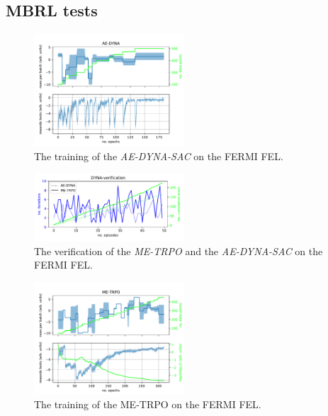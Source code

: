 \documentclass[
reprint,
amsmath,amssymb,amsfonts,clevref,
aps,
prstab,
]{revtex4-2}
\begin{document}
	\subsection{MBRL tests}
	\begin{figure}
		\centering
		\includegraphics*[width=0.5\textwidth]{Figures/AE-DYNA_observables.pdf}
		\caption{The training of the \emph{AE-DYNA-SAC} on the FERMI FEL.}
		\label{fig:AE-DYNA_observables}
	\end{figure}
	
	\begin{figure}
		\centering
		\includegraphics*[width=0.5\textwidth]{Figures/Verification_DYNA_all_episodes.pdf}
		\caption{The verification of the \emph{ME-TRPO} and the \emph{AE-DYNA-SAC} on the FERMI FEL.}
		\label{fig:AE-DYNA_verification}
	\end{figure}


	\begin{figure}
		\centering
		\includegraphics*[width=0.5\textwidth]{Figures/ME-TRPO_observables.pdf}
		\caption{The training of the ME-TRPO on the FERMI FEL.}
		\label{fig:ME-TRPO_observables}
	\end{figure}
\end{document}
